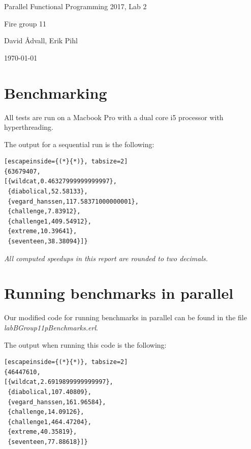 \documentclass[a4paper]{article}
\begin{document}
\begin{titlepage}
\centering
\LARGE{Parallel Functional Programming 2017, Lab 2}

\bigskip

\Large{Fire group 11}

\bigskip

\Large{David Ådvall, \linebreak
Erik Pihl}

\bigskip

\Large{\today}

\end{titlepage}

\newpage
\section{Benchmarking}
All tests are run on a Macbook Pro with a dual core i5 processor with hyperthreading.

The output for a sequential run is the following:
\begin{lstlisting}[escapeinside={(*}{*)}, tabsize=2]
{63679407,
[{wildcat,0.46327999999999997},
 {diabolical,52.58133},
 {vegard_hanssen,117.58371000000001},
 {challenge,7.83912},
 {challenge1,409.54912},
 {extreme,10.39641},
 {seventeen,38.38094}]}
 \end{lstlisting}

\textit{All computed speedups in this report are rounded to two decimals.}

\section{Running benchmarks in parallel}
Our modified code for running benchmarks in parallel can be found in the file \textit{labBGroup11\textunderscore pBenchmarks.erl}.

The output when running this code is the following:
\begin{lstlisting}[escapeinside={(*}{*)}, tabsize=2]
{46447610,
[{wildcat,2.6919899999999997},
 {diabolical,107.40809},
 {vegard_hanssen,161.96584},
 {challenge,14.09126},
 {challenge1,464.47204},
 {extreme,40.35819},
 {seventeen,77.88618}]}
\end{lstlisting}
\end{document}
